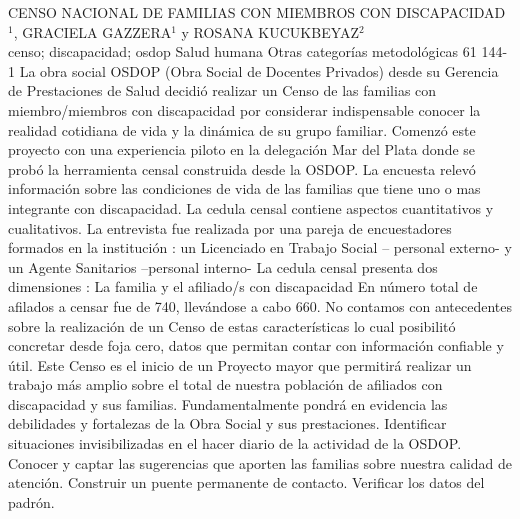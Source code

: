 \A
{CENSO NACIONAL DE FAMILIAS CON MIEMBROS CON DISCAPACIDAD}
{$^1$, GRACIELA GAZZERA$^1$ y ROSANA KUCUKBEYAZ$^2$}
{
\\}
{censo; discapacidad; osdop} 
 {Salud humana} 
 {Otras categorías metodológicas} 
 {61} 
 {144-1}
{La obra social OSDOP (Obra Social de Docentes Privados) desde su Gerencia de Prestaciones de Salud decidió realizar un Censo de las familias con miembro/miembros con discapacidad por considerar indispensable conocer la realidad cotidiana de vida y la dinámica de su grupo familiar. Comenzó este proyecto con una experiencia piloto en la delegación Mar del Plata donde se probó la herramienta censal construida desde la OSDOP. La encuesta relevó información sobre las condiciones de vida de las familias que tiene uno o mas integrante con discapacidad. La cedula censal contiene aspectos cuantitativos y cualitativos. La entrevista fue realizada por una pareja de encuestadores formados en la institución : un Licenciado en Trabajo Social – personal externo- y un Agente Sanitarios –personal interno- La cedula censal presenta dos dimensiones : La familia y el afiliado/s con discapacidad En número total de afilados a censar fue de 740, llevándose a cabo 660. No contamos con antecedentes sobre la realización de un Censo de estas características lo cual posibilitó concretar desde foja cero, datos que permitan contar con información confiable y útil. Este Censo es el inicio de un Proyecto mayor que permitirá realizar un trabajo más amplio sobre el total de nuestra población de afiliados con discapacidad y sus familias. Fundamentalmente pondrá en evidencia las debilidades y fortalezas de la Obra Social y sus prestaciones. Identificar situaciones invisibilizadas en el hacer diario de la actividad de la OSDOP. Conocer y captar las sugerencias que aporten las familias sobre nuestra calidad de atención. Construir un puente permanente de contacto. Verificar los datos del padrón. }

